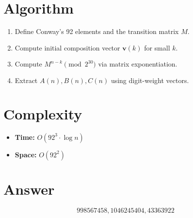 \documentclass[12pt]{article}
\theoremstyle{definition}
\begin{document}
\section{Algorithm}
\begin{enumerate}
    \item Define Conway's 92 elements and the transition matrix $M$.
    \item Compute initial composition vector $\mathbf{v}(k)$ for small $k$.
    \item Compute $M^{n-k} \pmod{2^{30}}$ via matrix exponentiation.
    \item Extract $A(n), B(n), C(n)$ using digit-weight vectors.
\end{enumerate}

\section{Complexity}
\begin{itemize}
    \item \textbf{Time:} $O(92^3 \cdot \log n)$
    \item \textbf{Space:} $O(92^2)$
\end{itemize}

\section{Answer}

\[
\boxed{998567458,1046245404,43363922}
\]
\end{document}
